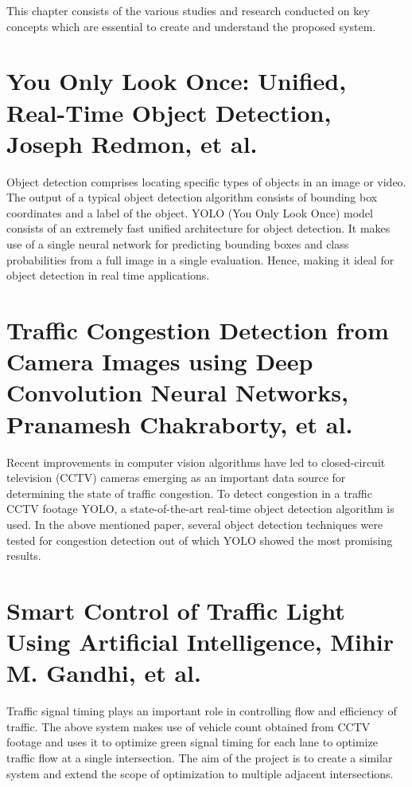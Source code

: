 \documentclass[openany,12pt]{report}
\begin{document}
	\hspace*{0.5in}This chapter consists of the various studies and research conducted on key concepts which are essential to create and understand the proposed system.
	
	\section{You Only Look Once: Unified, Real-Time Object Detection, Joseph Redmon, et al. \cite{paper1}}
	\hspace*{0.5in}Object detection comprises locating specific types of objects in an image or video. The output of a typical object detection algorithm consists of bounding box coordinates and a label of the object. YOLO (You Only Look Once) model consists of an extremely fast unified architecture for object detection. It makes use of a single neural network for predicting bounding boxes and class probabilities from a full image in a single evaluation. Hence, making it ideal for object detection in real time applications.\\
	
	\section{Traffic Congestion Detection from Camera Images using Deep Convolution Neural Networks, Pranamesh Chakraborty, et al. \cite{paper2}}
	\hspace*{0.5in}Recent improvements in computer vision algorithms have led to closed-circuit television (CCTV) cameras emerging as an important data source for determining the state of traffic congestion. To detect congestion in a traffic CCTV footage YOLO, a state-of-the-art real-time object detection algorithm is used. In the above mentioned paper, several object detection techniques were tested for congestion detection out of which YOLO showed the most promising results.\\
	
	\section{Smart Control of Traffic Light Using Artificial Intelligence, Mihir M. Gandhi, et al. \cite{paper3}}
	\hspace*{0.5in}Traffic signal timing plays an important role in controlling flow and efficiency of traffic.
	The above system makes use of vehicle count obtained from CCTV footage and uses it to  optimize green signal timing for each lane to optimize traffic flow at a single intersection. The aim of the project is to create a similar system and extend the scope of optimization to multiple adjacent intersections.\\
	
\end{document}

